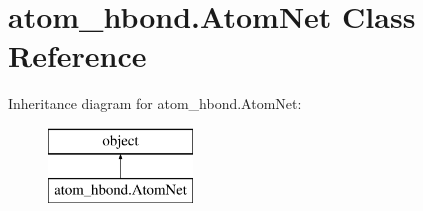 \hypertarget{classatom__hbond_1_1_atom_net}{\section{atom\-\_\-hbond.\-Atom\-Net Class Reference}
\label{classatom__hbond_1_1_atom_net}
}
Inheritance diagram for atom\-\_\-hbond.\-Atom\-Net\-:\begin{figure}[H]
\begin{center}
\leavevmode
\includegraphics[height=2.000000cm]{classatom__hbond_1_1_atom_net}
\end{center}
\end{figure}
